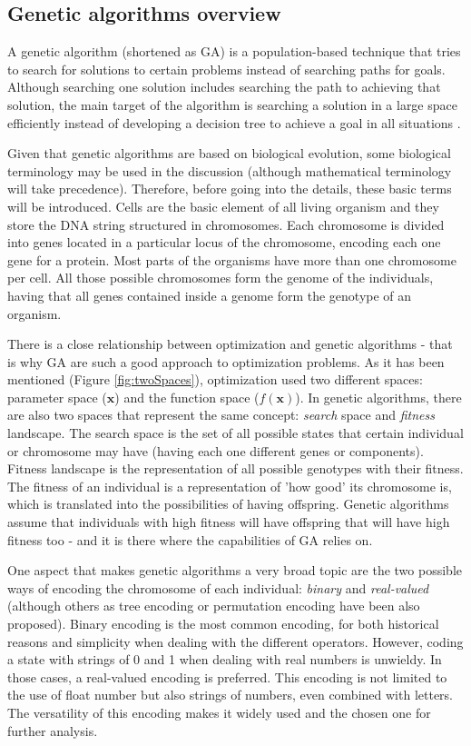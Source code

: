 \subsection{Genetic algorithms overview}
    
    A genetic algorithm (shortened as GA) is a population-based technique that tries to search for solutions to certain problems instead of searching paths for goals. Although searching one solution includes searching the path to achieving that solution, the main target of the algorithm is searching a solution in a large space efficiently instead of developing a decision tree to achieve a goal in all situations \cite{mitchell1998introduction}.
    
    Given that genetic algorithms are based on biological evolution, some biological terminology may be used in the discussion (although mathematical terminology will take precedence). Therefore, before going into the details, these basic terms will be introduced. Cells are the basic element of all living organism and they store the DNA string structured in chromosomes. Each chromosome is divided into genes located in a particular locus of the chromosome, encoding each one gene for a protein. Most parts of the organisms have more than one chromosome per cell. All those possible chromosomes form the genome of the individuals, having that all genes contained inside a genome form the genotype of an organism. 

    There is a close relationship between optimization and genetic algorithms - that is why GA are such a good approach to optimization problems. As it has been mentioned (Figure \ref{fig:twoSpaces}), optimization used two different spaces: parameter space ($\bm{x}$) and the function space ($f(\bm{x})$). In genetic algorithms, there are also two spaces that represent the same concept: \textit{search} space and \textit{fitness} landscape. The search space is the set of all possible states that certain individual or chromosome may have (having each one different genes or components). Fitness landscape is the representation of all possible genotypes with their fitness. The fitness of an individual is a representation of 'how good' its chromosome is, which is translated into the possibilities of having offspring. Genetic algorithms assume that individuals with high fitness will have offspring that will have high fitness too - and it is there where the capabilities of GA relies on.
    
    One aspect that makes genetic algorithms a very broad topic are the two possible ways of encoding the chromosome of each individual: \textit{binary} and \textit{real-valued} (although others as tree encoding or permutation encoding \cite{ronald1995genetic} have been also proposed). Binary encoding is the most common encoding, for both historical reasons and simplicity when dealing with the different operators. However, coding a state with strings of 0 and 1 when dealing with real numbers is unwieldy. In those cases, a real-valued encoding is preferred. This encoding is not limited to the use of float number but also strings of numbers, even combined with letters. The versatility of this encoding makes it widely used and the chosen one for further analysis. 
    
